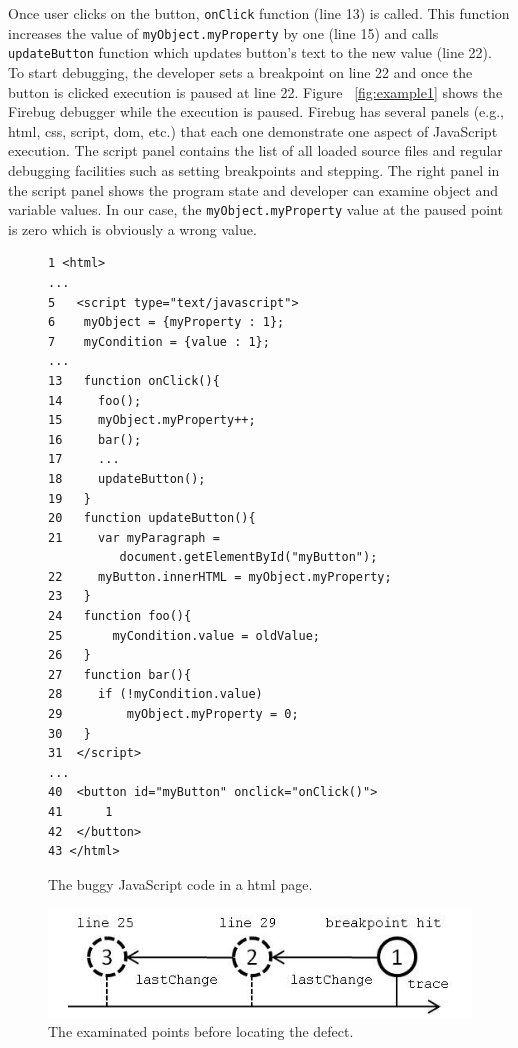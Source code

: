 \documentclass[preprint]{sigplanconf}
\begin{document}
Once user clicks on the button, \texttt{onClick} function (line 13) is
called. This function increases the value of
\texttt{myObject.myProperty} by one (line 15) and calls
\texttt{updateButton} function which updates button's text to the new
value (line 22). To start debugging, the developer sets a breakpoint
on line 22 and once the button is clicked execution is paused at line
22. Figure ~\ref{fig:example1} shows the Firebug debugger while the
execution is paused. Firebug has several panels (e.g., html, css,
script, dom, etc.) that each one demonstrate one aspect of JavaScript
execution. The script panel contains the list of all loaded source
files and regular debugging facilities such as setting breakpoints and
stepping. The right panel in the script panel shows the program state
and developer can examine object and variable values. In our case, the
\texttt{myObject.myProperty} value at the paused point is zero which
is obviously a wrong value.

\begin{figure}[htp]
\begin{verbatim}
1 <html>
...
5   <script type="text/javascript">
6    myObject = {myProperty : 1};
7    myCondition = {value : 1};
...
13   function onClick(){
14     foo();
15     myObject.myProperty++;
16     bar();
17     ...
18     updateButton();
19   }
20   function updateButton(){
21     var myParagraph =
          document.getElementById("myButton");
22     myButton.innerHTML = myObject.myProperty;
23   }   
24   function foo(){
25  	 myCondition.value = oldValue;
26   }  
27   function bar(){ 
28     if (!myCondition.value)
29         myObject.myProperty = 0;
30   }
31  </script> 
...
40  <button id="myButton" onclick="onClick()">
41  	1 
42  </button>
43 </html>
\end{verbatim}
\caption{The buggy JavaScript code in a html page.}
\label{fig:js-code}
\end{figure}


\begin{figure}[htp]
\includegraphics{5-example-points.jpg}
\caption{The examinated points before locating the defect.}
\label{fig:example-points}
\end{figure}
\end{document}
